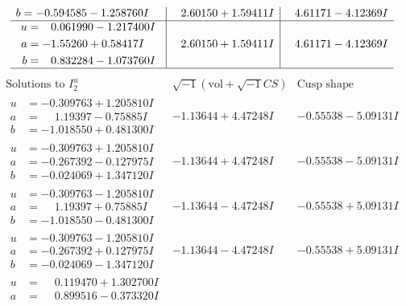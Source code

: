 \documentclass[1p]{elsarticle_modified}
\theoremstyle{definition}
\newcommand{\I}{\sqrt{-1}}
\begin{document}
$$\begin{array}{c|c|c}
\begin{aligned}
b &= -0.594585 - 1.258760 I\end{aligned}
 & \phantom{-}2.60150 + 1.59411 I & \phantom{-}4.61171 - 4.12369 I \\ \hline\begin{aligned}
u &= \phantom{-}0.061990 - 1.217400 I \\
a &= -1.55260 + 0.58417 I \\
b &= \phantom{-}0.832284 - 1.073760 I\end{aligned}
 & \phantom{-}2.60150 + 1.59411 I & \phantom{-}4.61171 - 4.12369 I\\
 \hline 
 \end{array}$$\newpage$$\begin{array}{c|c|c}  
\text{Solutions to }I^u_{2}& \I (\text{vol} + \sqrt{-1}CS) & \text{Cusp shape}\\
 \hline 
\begin{aligned}
u &= -0.309763 + 1.205810 I \\
a &= \phantom{-}1.19397 - 0.75885 I \\
b &= -1.018550 + 0.481300 I\end{aligned}
 & -1.13644 + 4.47248 I & -0.55538 - 5.09131 I \\ \hline\begin{aligned}
u &= -0.309763 + 1.205810 I \\
a &= -0.267392 - 0.127975 I \\
b &= -0.024069 + 1.347120 I\end{aligned}
 & -1.13644 + 4.47248 I & -0.55538 - 5.09131 I \\ \hline\begin{aligned}
u &= -0.309763 - 1.205810 I \\
a &= \phantom{-}1.19397 + 0.75885 I \\
b &= -1.018550 - 0.481300 I\end{aligned}
 & -1.13644 - 4.47248 I & -0.55538 + 5.09131 I \\ \hline\begin{aligned}
u &= -0.309763 - 1.205810 I \\
a &= -0.267392 + 0.127975 I \\
b &= -0.024069 - 1.347120 I\end{aligned}
 & -1.13644 - 4.47248 I & -0.55538 + 5.09131 I \\ \hline\begin{aligned}
u &= \phantom{-}0.119470 + 1.302700 I \\
a &= \phantom{-}0.899516 - 0.373320 I \\

\end{aligned}
\end{array}$$
\end{document}
